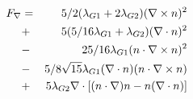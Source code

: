\documentclass[a4paper]{article}
\begin{document}
\begin{eqnarray*}
F_\nabla
 &=& 5/2(\lambda_{G1}+2\lambda_{G2})(\nabla\times n)^2\\
 &+& 5(5/16\lambda_{G1} + \lambda_{G2}) (\nabla\cdot n)^2\\
 &-& 25/16\lambda_{G1} (n\cdot\nabla\times n)^2\\
 &-& 5/8\sqrt{15}\lambda_{G1} (\nabla\cdot n)(n\cdot\nabla\times n)\\
 &+& 5\lambda_{G2}\nabla\cdot[(n\cdot\nabla)n - n(\nabla\cdot n)]\\
\end{eqnarray*}



\begin{eqnarray*}
\end{eqnarray*}
\end{document}
